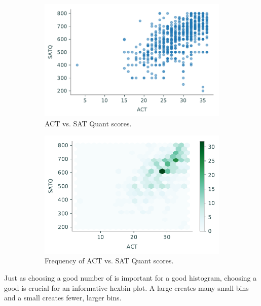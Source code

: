 \begin{figure}[H]
\captionsetup[subfigure]{justification=centering}
\centering
\begin{subfigure}{.49\textwidth}
    \includegraphics[width=\textwidth]{figures/scores_scatter.pdf}
    \caption{ACT vs. SAT Quant scores.}
    \label{fig:pandas-act-scatter}
\end{subfigure}
%
\begin{subfigure}{.49\textwidth}
    \includegraphics[width=\textwidth]{figures/scores_hexbin.pdf}
    \caption{Frequency of ACT vs. SAT Quant scores.}
    \label{fig:pandas-act-hexbin}
\end{subfigure}
\caption{}
\end{figure}

Just as choosing a good number of  is important for a good histogram, choosing a good  is crucial for an informative hexbin plot.
A large  creates many small bins and a small  creates fewer, larger bins.

